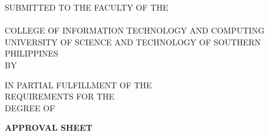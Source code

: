 \newcommand{\citcPrelimPage}[1]{%
  \clearpage\thispagestyle{prelim}%
  \begin{center}\textbf{\MakeUppercase{#1}}\end{center}%
  \vspace{3\baselineskip}%
}

\clearpage
{}
\setcounter{page}{1}

\thispagestyle{empty}
\begin{center}
\bfseries
\citcTitle

\vspace{5\baselineskip}
SUBMITTED TO THE FACULTY OF THE\\
\citcDepartment\\
COLLEGE OF INFORMATION TECHNOLOGY AND COMPUTING\\
UNIVERSITY OF SCIENCE AND TECHNOLOGY OF SOUTHERN PHILIPPINES\\
BY

\vspace{3\baselineskip}
\citcAuthors

\vspace{3\baselineskip}
IN PARTIAL FULFILLMENT OF THE\\
REQUIREMENTS FOR THE\\
DEGREE OF

\vspace{3\baselineskip}
\citcDegree

\vspace{3\baselineskip}
\citcSubmissionDate
\end{center}

\clearpage
\thispagestyle{empty}
\begin{center}\textbf{APPROVAL SHEET}\end{center}
\vspace{1\baselineskip}

